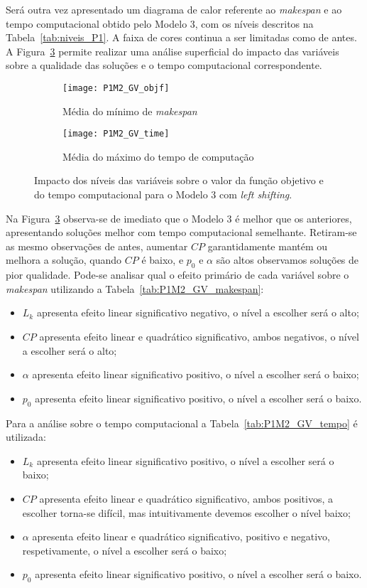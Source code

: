 Será outra vez apresentado um diagrama de calor referente ao \textit{makespan} e ao tempo computacional obtido pelo Modelo 3, com os níveis descritos na Tabela~\ref{tab:niveis_P1}. A faixa de cores continua a ser limitadas como de antes. A Figura~\ref{fig:P1M2_GV} permite realizar uma análise superficial do impacto das variáveis sobre a qualidade das soluções e o tempo computacional correspondente.\\
\begin{figure}[H]
	\centering
	\begin{subfigure}{0.49\textwidth}
	\centering
		\texttt{[image: P1M2\_GV\_objf]}
		\caption{Média do mínimo de \textit{makespan}}
		\label{fig:P1M2_GV_objf}
	\end{subfigure}
	\begin{subfigure}{0.49\textwidth}
	\centering
		\texttt{[image: P1M2\_GV\_time]}
		\caption{Média do máximo do tempo de computação}
		\label{fig:P1M2_GV_time}
	\end{subfigure}
	\caption{Impacto dos níveis das variáveis sobre o valor da função objetivo e do tempo computacional para o Modelo 3 com \textit{left shifting}.}
	\label{fig:P1M2_GV}
\end{figure}

Na Figura~\ref{fig:P1M2_GV} observa-se de imediato que o Modelo 3 é melhor que os anteriores, apresentando soluções melhor com tempo computacional semelhante. Retiram-se as mesmo observações de antes, aumentar $CP$ garantidamente mantém ou melhora a solução, quando $CP$ é baixo, e $p_{0}$ e $\alpha$ são altos observamos soluções de pior qualidade. Pode-se analisar qual o efeito primário de cada variável sobre o \textit{makespan} utilizando a Tabela~\ref{tab:P1M2_GV_makespan}:
\begin{itemize}
\item $L_{k}$ apresenta efeito linear significativo negativo, o nível a escolher será o alto;
\item $CP$ apresenta efeito linear e quadrático significativo, ambos negativos, o nível a escolher será o alto;
\item $\alpha$ apresenta efeito linear significativo positivo, o nível a escolher será o baixo;
\item $p_{0}$ apresenta efeito linear significativo positivo, o nível a escolher será o baixo.
\end{itemize}
Para a análise sobre o tempo computacional a Tabela~\ref{tab:P1M2_GV_tempo} é utilizada: 
\begin{itemize}
\item $L_{k}$ apresenta efeito linear significativo positivo, o nível a escolher será o baixo;
\item $CP$ apresenta efeito linear e quadrático significativo, ambos positivos, a escolher torna-se difícil, mas intuitivamente devemos escolher o nível baixo;
\item $\alpha$ apresenta efeito linear e quadrático significativo, positivo e negativo, respetivamente, o nível a escolher será o baixo;
\item $p_{0}$ apresenta efeito linear significativo positivo, o nível a escolher será o baixo.
\end{itemize}

